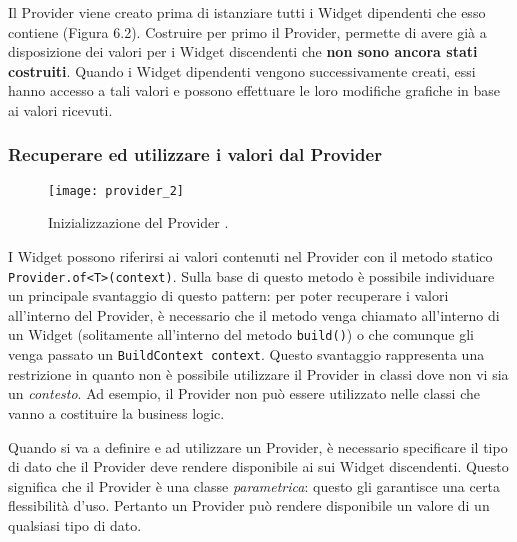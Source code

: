 Il Provider viene creato prima di istanziare tutti i Widget dipendenti che esso contiene (Figura 6.2). Costruire per primo il Provider, permette di avere già a disposizione dei valori per i Widget discendenti che \textbf{non sono ancora stati costruiti}. Quando i Widget dipendenti vengono successivamente creati, essi hanno accesso a tali valori e possono effettuare le loro modifiche grafiche in base ai valori ricevuti.

\subsubsection{Recuperare ed utilizzare i valori dal Provider}
\begin{figure}
	\begin{center}
		\texttt{[image: provider\_2]}
		\caption[Provider - Inizializzazione]{Inizializzazione del Provider \cite{provider_first}.}
		\label{figura:provider_2}
	\end{center}
\end{figure}

I Widget possono riferirsi ai valori contenuti nel Provider con il metodo statico \verb|Provider.of<T>(context)|. Sulla base di questo metodo è possibile individuare un principale svantaggio di questo pattern: per poter recuperare i valori all'interno del Provider, è necessario che il metodo venga chiamato all'interno di un Widget (solitamente all'interno del metodo \verb|build()|) o che comunque gli venga passato un \verb|BuildContext context|. Questo svantaggio rappresenta una restrizione in quanto non è possibile utilizzare il Provider in classi dove non vi sia un \textit{contesto}. Ad esempio, il Provider non può essere utilizzato nelle classi che vanno a costituire la business logic.

Quando si va a definire e ad utilizzare un Provider, è necessario specificare il tipo di dato che il Provider deve rendere disponibile ai sui Widget discendenti. Questo significa che il Provider è una classe \textit{parametrica}: questo gli garantisce una certa flessibilità d'uso. Pertanto un Provider può rendere disponibile un valore di un qualsiasi tipo di dato.

